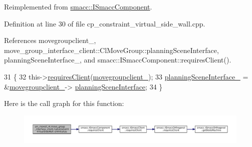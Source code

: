 Reimplemented from \hyperlink{classsmacc_1_1ISmaccComponent_ae6f71d008db12553912e9436184b9e65}{smacc\+::\+I\+Smacc\+Component}.



Definition at line 30 of file cp\+\_\+constraint\+\_\+virtual\+\_\+side\+\_\+wall.\+cpp.



References movegroupclient\+\_\+, move\+\_\+group\+\_\+interface\+\_\+client\+::\+Cl\+Move\+Group\+::planning\+Scene\+Interface, planning\+Scene\+Interface\+\_\+, and smacc\+::\+I\+Smacc\+Component\+::requires\+Client().


\begin{DoxyCode}
31         \{
32             this->\hyperlink{classsmacc_1_1ISmaccComponent_a36c085d906fbae0fcaee817aaeafebf4}{requiresClient}(\hyperlink{classsm__moveit__4_1_1move__group__interface__client_1_1CpConstraintVirtualSideWall_a8b3a32ceb9486f939030e54dd8223217}{movegroupclient\_});
33             \hyperlink{classsm__moveit__4_1_1move__group__interface__client_1_1CpConstraintVirtualSideWall_aa31132f6c2b476dafde6825090309498}{planningSceneInterface\_} = &\hyperlink{classsm__moveit__4_1_1move__group__interface__client_1_1CpConstraintVirtualSideWall_a8b3a32ceb9486f939030e54dd8223217}{movegroupclient\_}->
      \hyperlink{classmove__group__interface__client_1_1ClMoveGroup_a401213ca52233581d2a659dbb772720c}{planningSceneInterface};
34         \}
\end{DoxyCode}
Here is the call graph for this function\+:
\nopagebreak
\begin{figure}[H]
\begin{center}
\leavevmode
\includegraphics[width=350pt]{classsm__moveit__4_1_1move__group__interface__client_1_1CpConstraintVirtualSideWall_aa64ed2e50808871372b2ef76cbac8bbc_cgraph}
\end{center}
\end{figure}
\mbox{\label{classsm__moveit__4_1_1move__group__interface__client_1_1CpConstraintVirtualSideWall_a3a2636a6652706bc81721c0ce2d90643}} 
